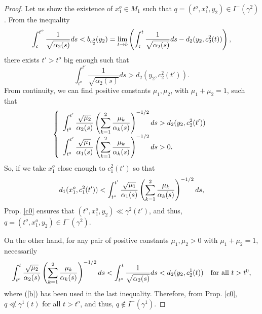 \begin{proof}
Let us show the existence of $x_1^o\in M_1$ such that $q=(t^o,x_1^o,y_2)\in I^-(\gamma^2)$. From the inequality
        \[
\int_{\mathfrak{c}}^{t^o}\frac{1}{\sqrt{\alpha_2(s)}}ds <b_{c_2^2}(y_2)=  \lim_{t\rightarrow b}\left(\int_{\mathfrak{c}}^t\frac{1}{\sqrt{\alpha_2(s)}}ds-d_2(y_2,c_2^2(t))\right),
          \]
        there exists $t'>t^o$ big enough such that
        \[
          \int_{t^o}^{t'}\frac{1}{\sqrt{\alpha_2(s)}}ds> d_2(y_2,c_2^2(t')).
        \]
        From continuity, we can find positive constants $\mu_1,\mu_2$, with $\mu_1+\mu_2=1$, such that
        \[
\left\{
  \begin{array}{l}
    \displaystyle\int_{t^0}^{t'} \frac{\sqrt{\mu_2}}{\alpha_{2}(s)}\left(\sum_{k=1}^{2} \frac{\mu_k}{\alpha_{k}(s)} \right)^{-1/2}ds>d_2(y_2,c_2^2(t'))\\
    \displaystyle \int_{t^0}^{t'} \frac{\sqrt{\mu_1}}{\alpha_{1}(s)}\left(\sum_{k=1}^{2} \frac{\mu_k}{\alpha_{k}(s)} \right)^{-1/2}ds>0.
  \end{array}
\right.
          \]
          So, if we take $x_1^o$ close enough to $c^2_1(t')$ so that
          \[d_1(x_1^o,c^2_1(t'))<\int_{t^o}^{t'} \frac{\sqrt{\mu_1}}{\alpha_{1}(s)}\left(\sum_{k=1}^{2} \frac{\mu_k}{\alpha_{k}(s)} \right)^{-1/2}ds,\] Prop. \ref{c0} ensures that $(t^o,x_1^o,y_2)\ll \gamma^2(t')$, and thus, $q=(t^o,x_1^o,y_2)\in I^-(\gamma^2)$.

          \smallskip

          On the other hand, for any pair of positive constants $\mu_1,\mu_2>0$ with $\mu_1+\mu_2=1$, necessarily
        \[
\int_{t^{o}}^{t} \frac{\sqrt{\mu_{2}}}{\alpha_{2}(s)}\left(\sum_{k=1}^{2} \frac{\mu_{k}}{\alpha_{k}(s)} \right)^{-1/2}ds<\int_{t^o}^t \frac{1}{\sqrt{\alpha_2(s)}}ds< d_2(y_2,c_2^1(t))\quad\hbox{for all $t>t^0$,}
          \]
          where (\ref{b}) has been used in the last inequality. Therefore, from Prop. \ref{c0}, $q\not\ll \gamma^1(t)$ for all $t>t^o$, and thus, $q\not\in I^-(\gamma^1)$.
\end{proof}


